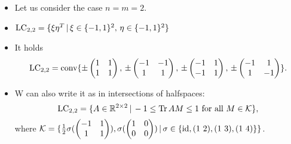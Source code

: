\begin{frame}
	\begin{itemize}
		\item<1-> Let us consider the case $ n=m=2 $.
		\item<2-> {\footnotesize  $ \textup{LC}_{2,2} = \{ \xi \eta^T \, | \, \xi \in \{ -1,1 \}^2, \, \eta \in \{ -1,1 \}^2 \} $}
		\item <2-> It holds 
		\begin{align*}
		\textup{LC}_{2,2}= \textup{conv} \{ \pm \begin{pmatrix}
		1 & 1 \\
		1 & 1
		\end{pmatrix} , \, \pm \begin{pmatrix}
		-1 & -1 \\
		1 & 1
		\end{pmatrix} , \, \pm \begin{pmatrix}
		-1 & 1 \\
		-1 & 1
		\end{pmatrix}, \, \pm \begin{pmatrix}
		-1 & 1 \\
		1 & -1
		\end{pmatrix}  \}.
		\end{align*}
		\item<3->
		W can also write it as in intersections of halfspaces: 
			\begin{equation}\label{facetsLC}
			\textup{LC}_{2,2} = \{ A \in \mathbb{R}^{2 \times 2} \, | \, -1 \le  \textup{Tr} \, {AM}  \le 1 \textup{ for all } M \in \mathcal{K} \},
			\end{equation}
			where $ \mathcal{K}  = \{ \frac{1}{2}\sigma(\begin{pmatrix}
			-1 & 1 \\
			1 & 1
			\end{pmatrix}), \sigma(\begin{pmatrix}
			1 & 0 \\
			0 & 0
			\end{pmatrix}) \, | \,  \sigma \in \{ \textup{id}, (1 \, \, 2), (1 \, \, 3), (1 \, \, 4) \} \} $.
		\end{itemize}
\end{frame}


